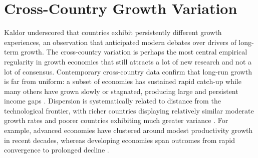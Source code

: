 \documentclass[\topdir/lecture\_notes.tex]{subfiles}
\begin{document}

\section{Cross-Country Growth Variation}

Kaldor underscored that countries exhibit persistently different growth experiences, an observation that anticipated modern debates over drivers of long-term growth.
The cross-country variation is perhaps the most central empirical regularity in growth economics that still attracts a lot of new research and not a lot of consensus\parencite{kaldor1957model,kaldor1961capital,jones2016facts}.
Contemporary cross-country data confirm that long-run growth is far from uniform: a subset of economies has sustained rapid catch-up while many others have grown slowly or stagnated, producing large and persistent income gaps \parencite{pritchett1997divergence,feenstrainklaartimmer2015pwt,worldbankwdi}.
Dispersion is systematically related to distance from the technological frontier, with richer countries displaying relatively similar moderate growth rates and poorer countries exhibiting much greater variance \parencite{jones2010new,jones2016facts,oecd2015productivity}.
For example, advanced economies have clustered around modest productivity growth in recent decades, whereas developing economies span outcomes from rapid convergence to prolonged decline \parencite{jones2016facts,oecd2015productivity}.
\end{document}
